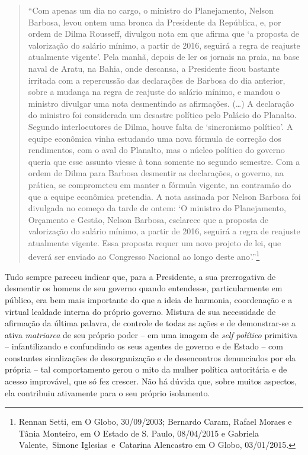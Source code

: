 \asterisc

\begin{quote}
``Com apenas um dia no cargo, o ministro do Planejamento, Nelson
Barbosa, levou ontem uma bronca da Presidente da República, e, por ordem
de Dilma Rousseff, divulgou nota em que afirma que `a proposta de
valorização do salário mínimo, a partir de 2016, seguirá a regra de
reajuste atualmente vigente'. Pela manhã, depois de ler os jornais na
praia, na base naval de Aratu, na Bahia, onde descansa, a Presidente
ficou bastante irritada com a repercussão das declarações de Barbosa do
dia anterior, sobre a mudança na regra de reajuste do salário mínimo, e
mandou o ministro divulgar uma nota desmentindo as afirmações. (…) A
declaração do ministro foi considerada um desastre político pelo Palácio
do Planalto. Segundo interlocutores de Dilma, houve falta de
`sincronismo político'. A equipe econômica vinha estudando uma nova
fórmula de correção dos rendimentos, com o aval do Planalto, mas o
núcleo político do governo queria que esse assunto viesse à tona somente
no segundo semestre. Com a ordem de Dilma para Barbosa desmentir as
declarações, o governo, na prática, se comprometeu em manter a fórmula
vigente, na contramão do que a equipe econômica pretendia. A nota
assinada por Nelson Barbosa foi divulgada no começo da tarde de ontem:
`O ministro do Planejamento, Orçamento e Gestão, Nelson Barbosa,
esclarece que a proposta de valorização do salário mínimo, a partir de
2016, seguirá a regra de reajuste atualmente vigente. Essa proposta
requer um novo projeto de lei, que deverá ser enviado ao Congresso
Nacional ao longo deste ano'.''\footnote{Rennan Setti, em O Globo,
  30/09/2003; Bernardo Caram, Rafael Moraes e Tânia Monteiro, em O
  Estado de S. Paulo, 08/04/2015 e Gabriela Valente,~Simone
  Iglesias~e~Catarina Alencastro em O Globo, 03/01/2015.}
\end{quote}

Tudo sempre pareceu indicar que, para a Presidente, a sua prerrogativa
de desmentir os homens de seu governo quando entendesse, particularmente
em público, era bem mais importante do que a ideia de harmonia,
coordenação e a virtual lealdade interna do próprio governo. Mistura de
sua necessidade de afirmação da última palavra, de controle de todas as
ações e de demonstrar-se a ativa \emph{matriarca} de seu próprio poder
-- em uma imagem de \emph{self} \emph{político} primitiva --
infantilizando e confundindo os seus agentes de governo e de Estado --
com constantes sinalizações de desorganização e de desencontros
denunciados por ela própria -- tal comportamento gerou o mito da mulher
política autoritária e de acesso improvável, que só fez crescer. Não há
dúvida que, sobre muitos aspectos, ela contribuiu ativamente para o seu
próprio isolamento.

